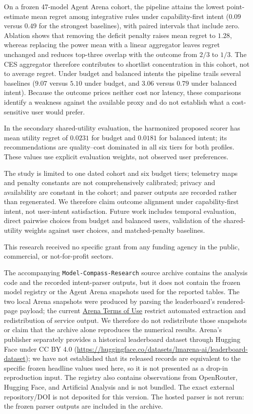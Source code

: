 \documentclass[pdflatex,sn-mathphys-num]{sn-jnl}
\theoremstyle{thmstyleone}
\theoremstyle{thmstylethree}
\begin{document}
On a frozen 47-model Agent Arena cohort, the pipeline attains the lowest point-estimate mean regret among integrative rules under capability-first intent ($0.09$ versus $0.49$ for the strongest baselines), with paired intervals that include zero. Ablation shows that removing the deficit penalty raises mean regret to $1.28$, whereas replacing the power mean with a linear aggregator leaves regret unchanged and reduces top-three overlap with the outcome from $2/3$ to $1/3$. The CES aggregator therefore contributes to shortlist concentration in this cohort, not to average regret. Under budget and balanced intents the pipeline trails several baselines ($9.07$ versus $5.10$ under budget, and $3.06$ versus $0.79$ under balanced intent). Because the outcome prices neither cost nor latency, these comparisons identify a weakness against the available proxy and do not establish what a cost-sensitive user would prefer.

In the secondary shared-utility evaluation, the harmonized proposed scorer has mean utility regret of $0.0231$ for budget and $0.0181$ for balanced intent; its recommendations are quality--cost dominated in all six tiers for both profiles. These values use explicit evaluation weights, not observed user preferences.

The study is limited to one dated cohort and six budget tiers; telemetry maps and penalty constants are not comprehensively calibrated; privacy and availability are constant in the cohort; and parser outputs are recorded rather than regenerated. We therefore claim outcome alignment under capability-first intent, not user-intent satisfaction. Future work includes temporal evaluation, direct pairwise choices from budget and balanced users, validation of the shared-utility weights against user choices, and matched-penalty baselines.

This research received no specific grant from any funding agency in the public, commercial, or not-for-profit sectors.

The accompanying \texttt{Model-Compass-Research} source archive contains the analysis code and the recorded intent-parser outputs, but it does not contain the frozen model registry or the Agent Arena snapshots used for the reported tables. The two local Arena snapshots were produced by parsing the leaderboard's rendered-page payload; the current \href{https://help.arena.ai/articles/5629909088-terms-of-use?lang=en}{Arena Terms of Use} restrict automated extraction and redistribution of service output. We therefore do not redistribute those snapshots or claim that the archive alone reproduces the numerical results. Arena's publisher separately provides a historical leaderboard dataset through Hugging Face under CC BY 4.0 (\url{https://huggingface.co/datasets/lmarena-ai/leaderboard-dataset}); we have not established that its released records are equivalent to the specific frozen headline values used here, so it is not presented as a drop-in reproduction input. The registry also contains observations from OpenRouter, Hugging Face, and Artificial Analysis and is not bundled. The exact external repository/DOI is not deposited for this version. The hosted parser is not rerun: the frozen parser outputs are included in the archive.
\end{document}
